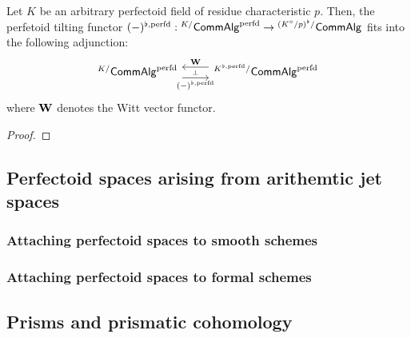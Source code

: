                 \begin{proposition} \label{prop: witt_tilt_adjunction}
                    Let $K$ be an arbitrary perfectoid field of residue characteristic $p$. Then, the perfetoid tilting functor $(-)^{\flat, \mathrm{perfd}}: {}^{K/}\mathsf{Comm}\mathsf{Alg}^{\mathrm{perfd}} \to {}^{(K^{\circ}/p)^{\flat}/}\mathsf{Comm}\mathsf{Alg}$ fits into the following adjunction:
                        $$
                            \begin{tikzcd}
                            	{{}^{K/}\Comm\Alg^{\perfd}} & {{}^{K^{\flat, \perfd}/}\Comm\Alg^{\perfd}}
                            	\arrow[""{name=0, anchor=center, inner sep=0}, "{(-)^{\flat, \perfd}}"', shift right=2, from=1-1, to=1-2]
                            	\arrow[""{name=1, anchor=center, inner sep=0}, "\W"', shift right=2, from=1-2, to=1-1]
                            	\arrow["\dashv"{anchor=center, rotate=-90}, draw=none, from=1, to=0]
                            \end{tikzcd}
                        $$
                    where $\mathbf{W}$ denotes the Witt vector functor.
                \end{proposition}
                    \begin{proof}
                        
                    \end{proof}
                    
        \subsection{Perfectoid spaces arising from arithemtic jet spaces}
                
            \subsubsection{Attaching perfectoid spaces to smooth schemes}
                
            \subsubsection{Attaching perfectoid spaces to formal schemes}
            
        \subsection{Prisms and prismatic cohomology}